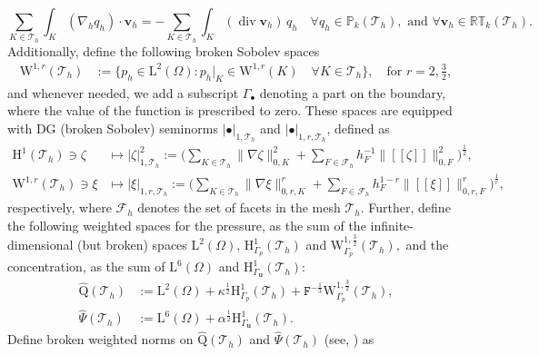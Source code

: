 \documentclass[11pt, reqno, a4paper, twoside]{article}
\newcommand{\bu}{\boldsymbol{u}}
\newcommand{\bv}{\boldsymbol{v}}
\newcommand{\rF}{\mathtt{F}}
\newcommand{\rH}{\mathrm{H}}
\newcommand{\rL}{\mathrm{L}}
\newcommand{\rW}{\mathrm{W}}
\newcommand{\rQ}{\mathrm{Q}}
\newcommand{\cT}{\mathcal{T}}
\newcommand\vdiv{\mathop{\mathrm{div}}\nolimits}
\numberwithin{equation}{section}
\numberwithin{remark}{section}
\numberwithin{figure}{section}
\numberwithin{table}{section}
\begin{document}
{{\begin{equation}\label{eq:disc.grad}
\sum_{K\in\cT_h}\int_K(\nabla_h q_h)\cdot\bv_h = -\sum_{K\in\cT_h}\int_K(\vdiv\bv_h)\,q_h \quad \forall q_h \in {\mathbb{P}_k(\cT_h)}, \text{ and } \forall \bv_h \in {\mathbb{RT}_k(\cT_h)}.
\end{equation}
Additionally, define the following broken Sobolev spaces 
\begin{align*}
    {\rW^{1,r}}(\mathcal{T}_h)&:=\{p_h\in\rL^2(\Omega):p_h|_K\in\rW^{1,r}(K) \quad \forall K\in \mathcal{T}_h\}, \quad \text{for } r=2,\frac32,
\end{align*}
and whenever needed, we add a subscript $\Gamma_{\bullet}$ denoting a part on the boundary, where the value of the function is prescribed to zero.  
These spaces are equipped with DG (broken Sobolev) seminorms 
\(|\bullet|_{{1,\mathcal{T}_h}}\) and 
\(|\bullet|_{{1, r, \mathcal{T}_h}}\),
defined as 
\begin{align*}
{\rH^1}(\mathcal{T}_h) \ni \zeta & \mapsto  |\zeta|^2_{{1,\mathcal{T}_h}} := \biggl(
\sum_{K\in\mathcal{T}_h}\| {\nabla} \zeta\|^{2}_{0,K} 
+ \sum_{F\in \mathcal{F}_h} h_F^{-1}\|[\![\zeta]\!]\|^2_{0,F}
\biggr)^{\frac12}, 
\\
\rW^{1,r}(\mathcal{T}_h) \ni \xi & \mapsto 
{|\xi|_{{1,r,\mathcal{T}_h}} := \biggl(\sum_{K\in\mathcal{T}_h}\|{\nabla} \xi\|^{r}_{0,r,K}
+ \sum_{F\in \mathcal{F}_h} h_F^{1-r}\|[\![\xi]\!]\|^{r}_{0,r,F}
\biggr)^{\frac{1}{r}}},\end{align*}
respectively, where $\mathcal{F}_h$ denotes the set of facets in the mesh $\cT_h$. 
%
Further, define the following weighted spaces for the pressure, as the sum of the infinite-dimensional (but broken) spaces $\rL^2(\Omega)$, \(\rH^1_{\Gamma_p}(\mathcal{T}_h)\) and \(\rW^{1,\frac32}_{\Gamma_p}(\mathcal{T}_h),\) and the concentration, as the sum of \(\rL^6(\Omega)\) and \(\rH^1_{\Gamma_{\bu}}(\cT_h):\)  
\begin{subequations}
\begin{align}\label{eq:broken.Qhat}
{\widehat{\rQ}}(\cT_h)&:=\rL^2(\Omega)+\kappa^\frac12\rH^1_{\Gamma_p}(\mathcal{T}_h)+\rF^{-\frac13}\rW^{1,\frac32}_{\Gamma_p}(\mathcal{T}_h),\\
\widehat{\Psi}(\cT_h)&:=\rL^6(\Omega)+\alpha^{\frac12}\rH^1_{\Gamma_{\bu}}(\cT_h).
\end{align}\end{subequations}
Define broken weighted norms on \({\widehat{\rQ}}(\cT_h)\) and \(\widehat{\Psi}(\cT_h)\) (see, \cite[Section~4]{dhpr_sinum26}) as  
\begin{align}

\end{align}}}
\end{document}

